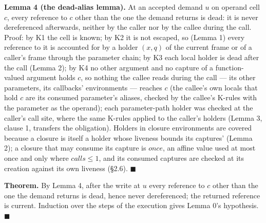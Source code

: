 \textbf{Lemma 4 (the dead-alias lemma).} At an accepted demand $u$ on operand cell $c$, every reference to $c$ other than the one the demand returns is dead: it is never dereferenced afterwards, neither by the caller nor by the callee during the call. Proof: by K1 the cell is known; by K2 it is not escaped, so (Lemma 1) every reference to it is accounted for by a holder $(x,\allowbreak{}q)$ of the current frame or of a caller's frame through the parameter chain; by K3 each local holder is dead after the call (Lemma 2); by K4 no other argument and no capture of a function-valued argument holds $c$, so nothing the callee reads during the call — its other parameters, its callbacks' environments — reaches $c$ (the callee's own locals that hold $c$ are its consumed parameter's aliases, checked by the callee's K-rules with the parameter as the operand); each parameter-path holder was checked at the caller's call site, where the same K-rules applied to the caller's holders (Lemma 3, clause 1, transfers the obligation). Holders in closure environments are covered because a closure is itself a holder whose liveness bounds its captures' (Lemma 2); a closure that may consume its capture is $\mathit{once}$, an affine value used at most once and only where $\mathit{calls}\le 1$, and its consumed captures are checked at its creation against its own liveness (§2.6). $\blacksquare$

\textbf{Theorem.} By Lemma 4, after the write at $u$ every reference to $c$ other than the one the demand returns is dead, hence never dereferenced; the returned reference is current. Induction over the steps of the execution gives Lemma 0's hypothesis. $\blacksquare$


